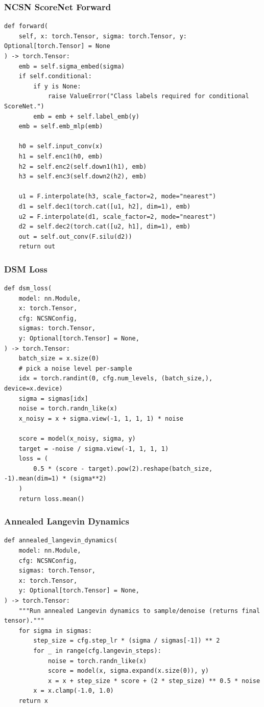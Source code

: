 \documentclass[a4paper,12pt]{article}
\begin{document}
\subsubsection{NCSN ScoreNet Forward}
\begin{verbatim}
def forward(
    self, x: torch.Tensor, sigma: torch.Tensor, y: Optional[torch.Tensor] = None
) -> torch.Tensor:
    emb = self.sigma_embed(sigma)
    if self.conditional:
        if y is None:
            raise ValueError("Class labels required for conditional ScoreNet.")
        emb = emb + self.label_emb(y)
    emb = self.emb_mlp(emb)

    h0 = self.input_conv(x)
    h1 = self.enc1(h0, emb)
    h2 = self.enc2(self.down1(h1), emb)
    h3 = self.enc3(self.down2(h2), emb)

    u1 = F.interpolate(h3, scale_factor=2, mode="nearest")
    d1 = self.dec1(torch.cat([u1, h2], dim=1), emb)
    u2 = F.interpolate(d1, scale_factor=2, mode="nearest")
    d2 = self.dec2(torch.cat([u2, h1], dim=1), emb)
    out = self.out_conv(F.silu(d2))
    return out
\end{verbatim}

\subsubsection{DSM Loss}
\begin{verbatim}
def dsm_loss(
    model: nn.Module,
    x: torch.Tensor,
    cfg: NCSNConfig,
    sigmas: torch.Tensor,
    y: Optional[torch.Tensor] = None,
) -> torch.Tensor:
    batch_size = x.size(0)
    # pick a noise level per-sample
    idx = torch.randint(0, cfg.num_levels, (batch_size,), device=x.device)
    sigma = sigmas[idx]
    noise = torch.randn_like(x)
    x_noisy = x + sigma.view(-1, 1, 1, 1) * noise

    score = model(x_noisy, sigma, y)
    target = -noise / sigma.view(-1, 1, 1, 1)
    loss = (
        0.5 * (score - target).pow(2).reshape(batch_size, -1).mean(dim=1) * (sigma**2)
    )
    return loss.mean()
\end{verbatim}

\subsubsection{Annealed Langevin Dynamics}
\begin{verbatim}
def annealed_langevin_dynamics(
    model: nn.Module,
    cfg: NCSNConfig,
    sigmas: torch.Tensor,
    x: torch.Tensor,
    y: Optional[torch.Tensor] = None,
) -> torch.Tensor:
    """Run annealed Langevin dynamics to sample/denoise (returns final tensor)."""
    for sigma in sigmas:
        step_size = cfg.step_lr * (sigma / sigmas[-1]) ** 2
        for _ in range(cfg.langevin_steps):
            noise = torch.randn_like(x)
            score = model(x, sigma.expand(x.size(0)), y)
            x = x + step_size * score + (2 * step_size) ** 0.5 * noise
        x = x.clamp(-1.0, 1.0)
    return x
\end{verbatim}
\end{document}

